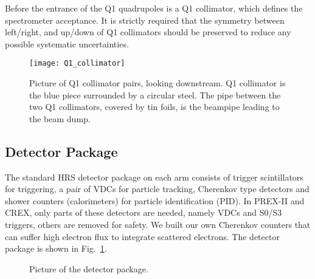 Before the entrance of the Q1 quadrupoles is a Q1 collimator, which defines
the spectrometer acceptance. It is strictly required that the symmetry between
left/right, and up/down of Q1 collimators should be preserved to reduce any
possible systematic uncertainties.
\begin{figure}[!h]
    \centering
    \texttt{[image: Q1\_collimator]}
    \caption{Picture of Q1 collimator pairs, looking downstream. 
    Q1 collimator is the blue piece surrounded by a circular steel.
    The pipe between the two Q1 collimators, covered by tin foils, is the
    beampipe leading to the beam dump.
    }
\end{figure}
\subsection{Detector Package}
The standard HRS detector package on each arm consists of trigger scintillators for
triggering, a pair of VDCs for particle tracking, Cherenkov type detectors and
shower counters (calorimeters) for particle identification (PID). In PREX-II
and CREX, only parts of these detectors are needed, namely VDCs and S0/S3 triggers,
others are removed for safety. We built our own Cherenkov counters that can 
suffer high electron flux to integrate scattered electrons. The detector package
is shown in Fig.~\ref{fig:detectors}.
\begin{figure}[!h]
    \centering
    \caption{Picture of the detector package.}
    \label{fig:detectors}
\end{figure}

